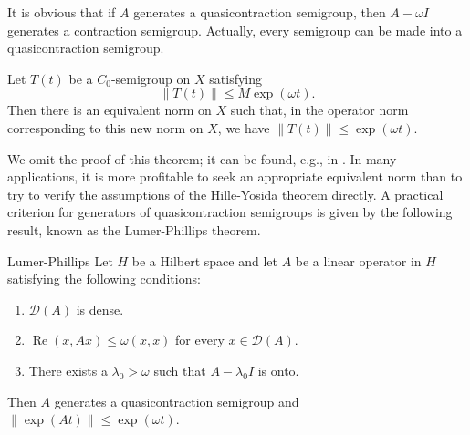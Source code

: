 It is obvious that if $A$ generates a quasicontraction semigroup, then $A-\omega I$ generates a contraction semigroup. Actually, every semigroup can be made into a quasicontraction semigroup.

\begin{Theorem}
\label{thm:semigroup-equivalent-quasicontraction-norm}
Let $T(t)$ be a $C_0$-semigroup on $X$ satisfying
\begin{equation}\label{eq:semigroup-equivalent-quasicontraction-norm-growth-hypothesis}
\|T(t)\|\leq M\exp(\omega t).
\end{equation}
Then there is an equivalent norm on $X$ such that, in the operator norm corresponding to this new norm on $X$, we have $\|T(t)\|\leq\exp(\omega t)$.
\end{Theorem}

We omit the proof of this theorem; it can be found, e.g., in \cite{Pa}. In many applications, it is more profitable to seek an appropriate equivalent norm than to try to verify the assumptions of the Hille-Yosida theorem directly. A practical criterion for generators of quasicontraction semigroups is given by the following result, known as the Lumer-Phillips theorem.

\begin{Theorem}{Lumer-Phillips}
\label{thm:lumer-phillips-generation}
Let $H$ be a Hilbert space and let $A$ be a linear operator in $H$ satisfying the following conditions:\begin{enumerate}\item\label{hyp:lumer-phillips-dense-domain} $\mathcal{D}(A)$ is dense.\item\label{hyp:lumer-phillips-quasidissipativity} $\operatorname{Re}(x,Ax)\leq\omega(x,x)$ for every $x\in\mathcal{D}(A)$.\item\label{hyp:lumer-phillips-surjectivity} There exists a $\lambda_0>\omega$ such that $A-\lambda_0I$ is onto.\end{enumerate}Then $A$ generates a quasicontraction semigroup and $\|\exp(At)\|\leq\exp(\omega t)$.
\end{Theorem}

\begingroup
\renewcommand{\endProof}{\par\nobreak\hfill$\blacksquare$\par\vspace{0.1cm}}
\endgroup

